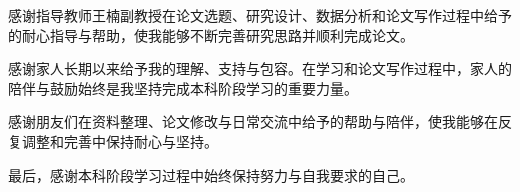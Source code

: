 \documentclass[type = bachelor, openany]{whu-thesis}
\begin{document}
\let\cleardoublepage\clearpage

\tableofcontents

\mainmatter









\printbibliography

\begin{acknowledgements}
感谢指导教师王楠副教授在论文选题、研究设计、数据分析和论文写作过程中给予的耐心指导与帮助，使我能够不断完善研究思路并顺利完成论文。

感谢家人长期以来给予我的理解、支持与包容。在学习和论文写作过程中，家人的陪伴与鼓励始终是我坚持完成本科阶段学习的重要力量。

感谢朋友们在资料整理、论文修改与日常交流中给予的帮助与陪伴，使我能够在反复调整和完善中保持耐心与坚持。

最后，感谢本科阶段学习过程中始终保持努力与自我要求的自己。
\end{acknowledgements}

\appendix

\end{document}
